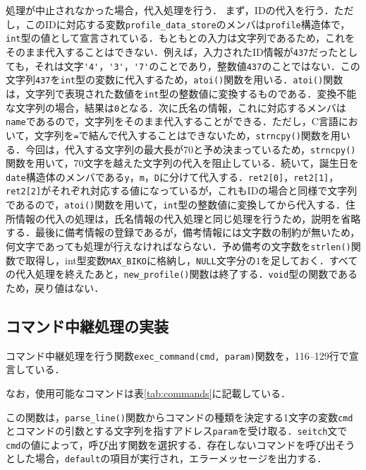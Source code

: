 処理が中止されなかった場合，代入処理を行う．
まず，IDの代入を行う．ただし，このIDに対応する変数\verb|profile_data_store|のメンバは\verb|profile|構造体で，\verb|int|型の値として宣言されている．もともとの入力は文字列であるため，これをそのまま代入することはできない．例えば，入力されたID情報が\verb|437|だったとしても，それは文字\verb|'4'|，\verb|'3'|，\verb|'7'|のことであり，整数値\verb|437|のことではない．この文字列\verb|437|を\verb|int|型の変数に代入するため，\verb|atoi()|関数を用いる．\verb|atoi()|関数は，文字列で表現された数値を\verb|int|型の整数値に変換するものである．変換不能な文字列の場合，結果は\verb|0|となる\cite{www:label6}．次に氏名の情報，これに対応するメンバは\verb|name|であるので，文字列をそのまま代入することができる．ただし，C言語において，文字列を\verb|=|で結んで代入することはできないため，\verb|strncpy()|関数を用いる．今回は，代入する文字列の最大長が70と予め決まっているため，\verb|strncpy()|関数を用いて，70文字を越えた文字列の代入を阻止している\cite{www:label5}．続いて，誕生日を\verb|date|構造体のメンバである\verb|y|，\verb|m|，\verb|D|に分けて代入する．\verb|ret2[0]|，\verb|ret2[1]|，\verb|ret2[2]|がそれぞれ対応する値になっているが，これもIDの場合と同様で文字列であるので，\verb|atoi()|関数を用いて，\verb|int|型の整数値に変換してから代入する．住所情報の代入の処理は，氏名情報の代入処理と同じ処理を行うため，説明を省略する．最後に備考情報の登録であるが，備考情報には文字数の制約が無いため，何文字であっても処理が行えなければならない．予め備考の文字数を\verb|strlen()|関数で取得し，int型変数\verb|MAX_BIKO|に格納し，\verb|NULL|文字分の$1$を足しておく．すべての代入処理を終えたあと，\verb|new_profile()|関数は終了する．\verb|void|型の関数であるため，戻り値はない．

\subsection{コマンド中継処理の実装}

コマンド中継処理を行う関数\verb|exec_command(cmd, param)|関数を，116--129行で宣言している．

なお，使用可能なコマンドは表\ref{tab:commands}に記載している．

この関数は，\verb|parse_line()|関数からコマンドの種類を決定する1文字の変数\verb|cmd|とコマンドの引数とする文字列を指すアドレス\verb|param|を受け取る．\verb|seitch|文で\verb|cmd|の値によって，呼び出す関数を選択する．存在しないコマンドを呼び出そうとした場合，\verb|default|の項目が実行され，エラーメッセージを出力する．

